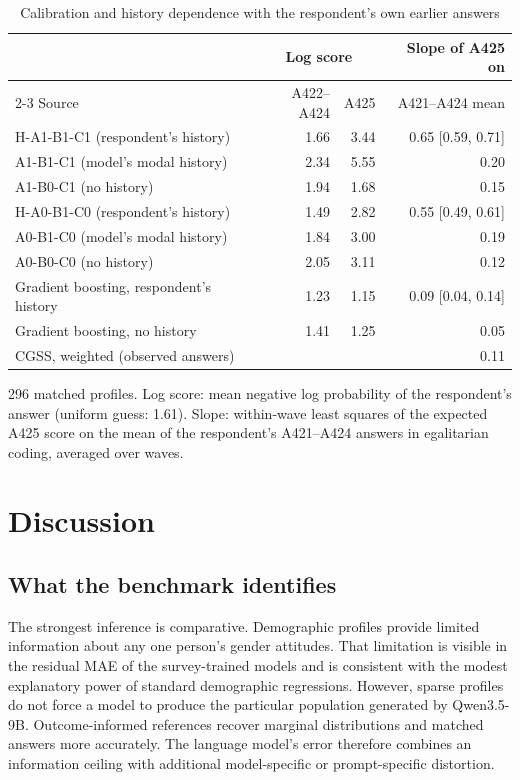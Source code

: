 \documentclass[11pt]{article}
\begin{document}
\begin{table}[H]
\centering
\caption{Calibration and history dependence with the respondent's own earlier answers}
\label{tab:humanhist}
\small
\begin{tabular}{lrrr}
\toprule
 & \multicolumn{2}{c}{Log score} & Slope of A425 on \\
\cmidrule(lr){2-3}
Source & A422--A424 & A425 & A421--A424 mean \\
\midrule
H-A1-B1-C1 (respondent's history) & 1.66 & 3.44 & 0.65 [0.59, 0.71] \\
A1-B1-C1 (model's modal history) & 2.34 & 5.55 & 0.20 \\
A1-B0-C1 (no history) & 1.94 & 1.68 & 0.15 \\
\addlinespace
H-A0-B1-C0 (respondent's history) & 1.49 & 2.82 & 0.55 [0.49, 0.61] \\
A0-B1-C0 (model's modal history) & 1.84 & 3.00 & 0.19 \\
A0-B0-C0 (no history) & 2.05 & 3.11 & 0.12 \\
\addlinespace
Gradient boosting, respondent's history & 1.23 & 1.15 & 0.09 [0.04, 0.14] \\
Gradient boosting, no history & 1.41 & 1.25 & 0.05 \\
CGSS, weighted (observed answers) & & & 0.11 \\
\bottomrule
\end{tabular}
\begin{tablenotes}\footnotesize
\item 296 matched profiles. Log score: mean negative log probability of the respondent's answer (uniform guess: 1.61). Slope: within-wave least squares of the expected A425 score on the mean of the respondent's A421--A424 answers in egalitarian coding, averaged over waves.
\end{tablenotes}
\end{table}

\section{Discussion}

\subsection{What the benchmark identifies}

The strongest inference is comparative. Demographic profiles provide limited information about any one person's gender attitudes. That limitation is visible in the residual MAE of the survey-trained models and is consistent with the modest explanatory power of standard demographic regressions. However, sparse profiles do not force a model to produce the particular population generated by Qwen3.5-9B. Outcome-informed references recover marginal distributions and matched answers more accurately. The language model's error therefore combines an information ceiling with additional model-specific or prompt-specific distortion.
\end{document}
